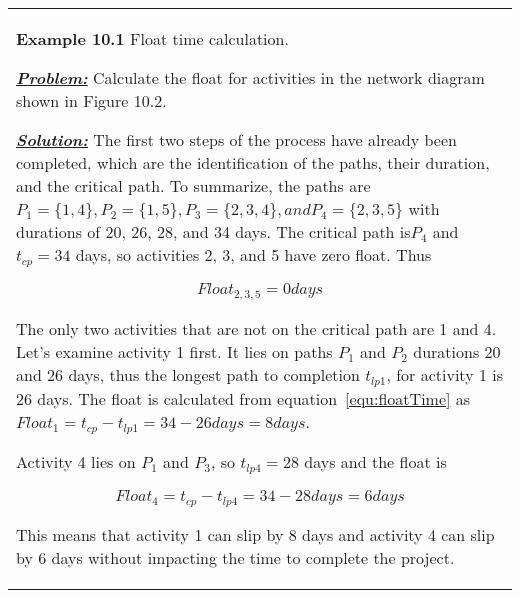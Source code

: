 \begin{table}
\begin{tabular}{m{15cm}||}
\textbf{Example 10.1} Float time calculation.

\emph{\textbf{\ul{Problem:}}} Calculate the float for activities in the
network diagram shown in Figure 10.2.

\emph{\textbf{\ul{Solution:}}} The first two steps of the process have
already been completed, which are the identification of the paths, their
duration, and the critical path. To summarize, the paths are
$P_1 = \{1,4\}, P_2=\{1,5\}, P_3 =\{2,3,4\}, and P_4 =\{2,3,5\}$
with durations of 20, 26, 28, and 34 days. The critical path is$P_4$
and $t_{cp}=34$ days, so activities 2, 3, and 5 have zero float. Thus

$$Float_{2,3,5} = 0 days$$

The only two activities that are not on the critical path are 1 and 4.
Let's examine activity 1 first. It lies on paths $P_1$ and $P_2$
durations 20 and 26 days, thus the longest path to completion
$t_{lp1}$, for activity 1 is 26 days. The float is calculated from 
equation~\ref{equ:floatTime} as 
$Float_{1} =t_{cp} - t_{lp1} = 34-26 days = 8 days$.

Activity 4 lies on $P_1$ and $P_3$, so $t_{lp4} = 28$ days and the float is

$$Float_{4} = t_{cp} - t_{lp4} = 34 -28 days = 6 days$$

This means that activity 1 can slip by 8 days and activity 4 can slip by
6 days without impacting the time to complete the project.
\end{tabular}
\end{table}


